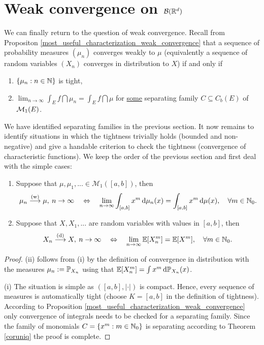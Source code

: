 \section[Weak convergence on $\mathcal B(\R)$]{Weak convergence on $\mathcal B(\R^d)$}
We can finally return to the question of weak convergence. Recall from Propositon \ref{most_useful_characterization_weak_convergence} that a sequence of probability measures $(\mu_n)$ converges weakly to $\mu$ (equivalently a sequence of random variables $(X_n)$ converges in distribution to $X$) if and only if
\begin{enumerate}[label=(\roman*)]
	\item $\{\mu_n:n\in\N\}$ is tight,
	\item $ \lim_{n\to\infty} \int_E f \dint \mu_n = \int_E f \dint \mu$ for \underline{some} separating family $C \subseteq C_b(E)$ of $\cM_1(E)$.
\end{enumerate}
We have identified separating families in the previous section. It now remains to identify situations in which the tightness trivially holds (bounded and non-negative) and give a handable criterion to check the tightness (convergence of characteristic functions). We keep the order of the previous section and first deal with the simple cases:
\begin{lsatzwichtig}
\begin{theorem}
	\begin{enumerate}[label=(\roman*)]
		\item Suppose that $\mu,\mu_1,...\in \mathcal M_1([a,b])$, then 
	\begin{align*}
		\mu_n \overset{\text{(w)}}{\longrightarrow} \mu,\: n \to \infty \quad\Leftrightarrow \quad \lim_{n\to\infty}\int_{[a,b]} x^m\dint \mu_n(x)=\int_{[a,b]} x^m\dint \mu(x),\quad \forall m\in\N_0.
	\end{align*}
	\item Suppose that $X,X_1,...$ are random variables with values in $[a,b]$, then 
	\begin{align*}
		X_n \overset{\text{(d)}}{\longrightarrow} X,\: n \to \infty \quad\Leftrightarrow \quad \lim_{n\to\infty}\E[X_n^m]=\E[X^m], \quad \forall m\in\N_0.
	\end{align*}
\end{enumerate}
\end{theorem}
\end{lsatzwichtig}
\begin{proof}[Proof]
	(ii) follows from (i) by the definition of convergence in distribution with the measures $\mu_n:=\P_{X_n}$ using that $\E[X_n^m]=\int x^m \dint \P_{X_n}(x)$.\smallskip

	(i) The situation is simple as $([a,b],|\cdot|)$ is compact. Hence, every sequence of measures is automatically tight (choose $K=[a,b]$ in the definition of tightness). According to Proposition \ref{most_useful_characterization_weak_convergence} only convergence of integrals needs to be checked for a separating family. Since the family of monomials $C=\{x^m:m\in\N_0\}$ is separating according to Theorem \ref{coruniq} the proof is complete.
\end{proof}

